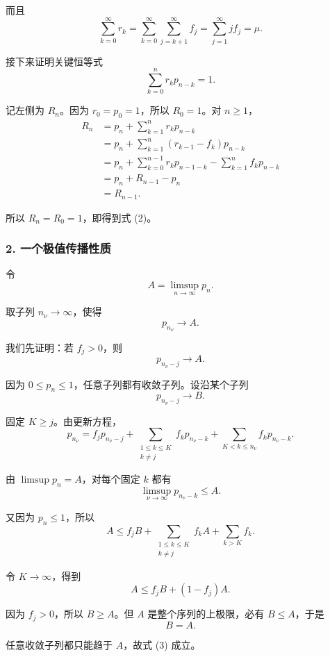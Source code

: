 \documentclass[11pt,a4paper]{ctexart}
\begin{document}
而且
\begin{equation}\tag{1}
\sum_{k=0}^{\infty}r_k
=\sum_{k=0}^{\infty}\sum_{j=k+1}^{\infty}f_j
=\sum_{j=1}^{\infty}jf_j
=\mu.
\end{equation}

接下来证明关键恒等式
\[
\boxed{\sum_{k=0}^n r_kp_{n-k}=1.}
\tag{2}
\]

记左侧为 $R_n$。因为 $r_0=p_0=1$，所以 $R_0=1$。对 $n\ge1$，
\[
\begin{aligned}
R_n
&=p_n+\sum_{k=1}^n r_kp_{n-k}\\
&=p_n+\sum_{k=1}^n(r_{k-1}-f_k)p_{n-k}\\
&=p_n+\sum_{k=0}^{n-1}r_kp_{n-1-k}
-\sum_{k=1}^nf_kp_{n-k}\\
&=p_n+R_{n-1}-p_n\\
&=R_{n-1}.
\end{aligned}
\]

所以 $R_n=R_0=1$，即得到式 (2)。

\subsubsection*{2. 一个极值传播性质}

令
\[
A=\limsup_{n\to\infty}p_n.
\]

取子列 $n_\nu\to\infty$，使得
\[
p_{n_\nu}\longrightarrow A.
\]

我们先证明：若 $f_j>0$，则
\begin{equation}\tag{3}
p_{n_\nu-j}\longrightarrow A.
\end{equation}

因为 $0\le p_n\le1$，任意子列都有收敛子列。设沿某个子列
\[
p_{n_\nu-j}\longrightarrow B.
\]

固定 $K\ge j$。由更新方程，
\[
p_{n_\nu}
=
f_jp_{n_\nu-j}
+\sum_{\substack{1\le k\le K\\k\ne j}}
f_kp_{n_\nu-k}
+\sum_{K<k\le n_\nu}f_kp_{n_\nu-k}.
\]

由 $\limsup p_n=A$，对每个固定 $k$ 都有
\[
\limsup_{\nu\to\infty}p_{n_\nu-k}\le A.
\]

又因为 $p_n\le1$，所以
\[
A
\le
f_jB+
\sum_{\substack{1\le k\le K\\k\ne j}}f_kA
+\sum_{k>K}f_k.
\]

令 $K\to\infty$，得到
\[
A\le f_jB+(1-f_j)A.
\]

因为 $f_j>0$，所以 $B\ge A$。但 $A$ 是整个序列的上极限，必有 $B\le A$，于是
\[
B=A.
\]

任意收敛子列都只能趋于 $A$，故式 (3) 成立。
\end{document}
